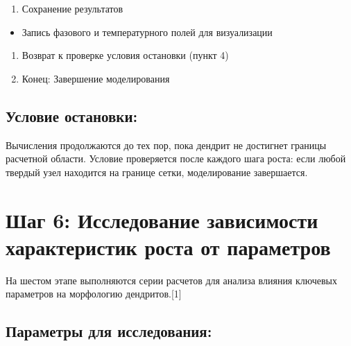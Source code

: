 \documentclass[
  12pt,
  a4paper,
  DIV=11,
  numbers=noendperiod]{scrreprt}
\providecommand{\tightlist}{%
  \setlength{\itemsep}{0pt}\setlength{\parskip}{0pt}}\usepackage{longtable,booktabs,array}
\begin{document}
\begin{enumerate}
\def\labelenumi{\arabic{enumi}.}
\setcounter{enumi}{6}
\tightlist
\item
  Сохранение результатов
\end{enumerate}

\begin{itemize}
\tightlist
\item
  Запись фазового и температурного полей для визуализации
\end{itemize}

\begin{enumerate}
\def\labelenumi{\arabic{enumi}.}
\setcounter{enumi}{7}
\item
  Возврат к проверке условия остановки (пункт 4)
\item
  Конец: Завершение моделирования
\end{enumerate}

\subsection{Условие
остановки:}\label{ux443ux441ux43bux43eux432ux438ux435-ux43eux441ux442ux430ux43dux43eux432ux43aux438}

Вычисления продолжаются до тех пор, пока дендрит не достигнет границы
расчетной области. Условие проверяется после каждого шага роста: если
любой твердый узел находится на границе сетки, моделирование
завершается.

\section{Шаг 6: Исследование зависимости характеристик роста от
параметров}\label{ux448ux430ux433-6-ux438ux441ux441ux43bux435ux434ux43eux432ux430ux43dux438ux435-ux437ux430ux432ux438ux441ux438ux43cux43eux441ux442ux438-ux445ux430ux440ux430ux43aux442ux435ux440ux438ux441ux442ux438ux43a-ux440ux43eux441ux442ux430-ux43eux442-ux43fux430ux440ux430ux43cux435ux442ux440ux43eux432}

На шестом этапе выполняются серии расчетов для анализа влияния ключевых
параметров на морфологию дендритов.{[}1{]}

\subsection{Параметры для
исследования:}\label{ux43fux430ux440ux430ux43cux435ux442ux440ux44b-ux434ux43bux44f-ux438ux441ux441ux43bux435ux434ux43eux432ux430ux43dux438ux44f}
\end{document}
